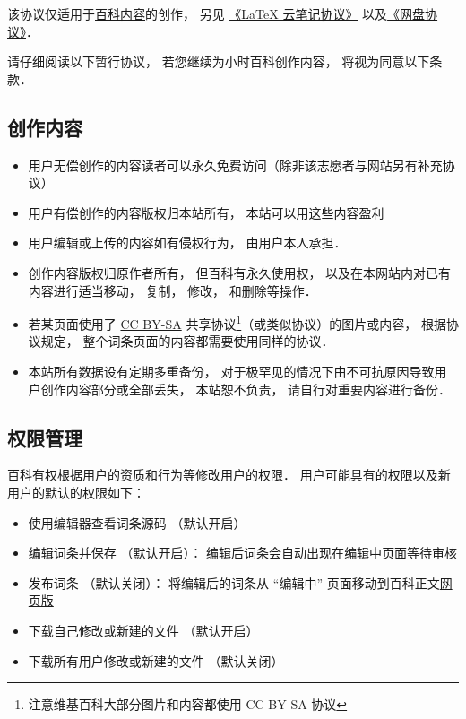 
该协议仅适用于\href{http://wuli.wiki/online/}{百科内容}的创作， 另见 \href{http://wuli.wiki/online/NtLcns.html}{《LaTeX 云笔记协议》} 以及\href{http://www.example.com}{《网盘协议》}．

请仔细阅读以下暂行协议， 若您继续为小时百科创作内容， 将视为同意以下条款．

\subsection{创作内容}
\begin{itemize}
\item 用户无偿创作的内容读者可以永久免费访问（除非该志愿者与网站另有补充协议）
\item 用户有偿创作的内容版权归本站所有， 本站可以用这些内容盈利
\item 用户编辑或上传的内容如有侵权行为， 由用户本人承担．
\item 创作内容版权归原作者所有， 但百科有永久使用权， 以及在本网站内对已有内容进行适当移动， 复制， 修改， 和删除等操作．
\item 若某页面使用了 \href{https://creativecommons.org/licenses/by-sa/3.0/}{CC BY-SA} 共享协议\footnote{注意维基百科大部分图片和内容都使用 CC BY-SA 协议}（或类似协议）的图片或内容， 根据协议规定， 整个词条页面的内容都需要使用同样的协议．
\item 本站所有数据设有定期多重备份， 对于极罕见的情况下由不可抗原因导致用户创作内容部分或全部丢失， 本站恕不负责， 请自行对重要内容进行备份．
\end{itemize}

\subsection{权限管理}
百科有权根据用户的资质和行为等修改用户的权限． 用户可能具有的权限以及新用户的默认的权限如下：
\begin{itemize}
\item 使用编辑器查看词条源码 （默认开启）
\item 编辑词条并保存 （默认开启）： 编辑后词条会自动出现在\href{http://wuli.wiki/changed}{编辑中}页面等待审核
\item 发布词条 （默认关闭）： 将编辑后的词条从 “编辑中” 页面移动到百科正文\href{http://wuli.wiki/online}{网页版}
\item 下载自己修改或新建的文件 （默认开启）
\item 下载所有用户修改或新建的文件 （默认关闭）
\end{itemize}
